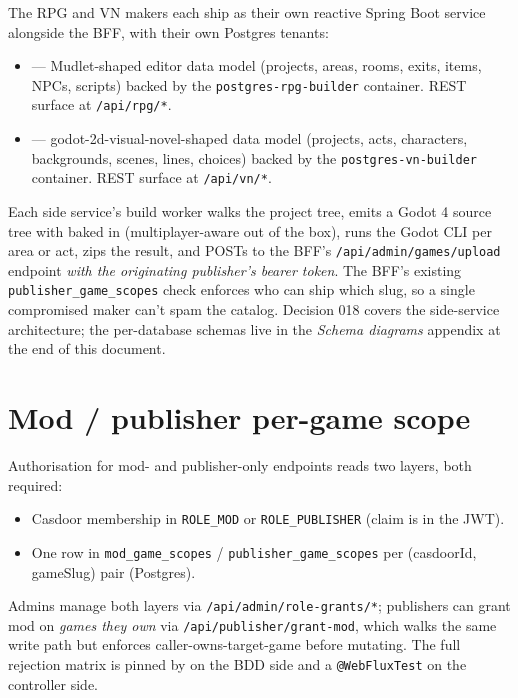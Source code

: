 The RPG and VN makers each ship as their own reactive Spring Boot
service alongside the BFF, with their own Postgres tenants:

\begin{itemize}
  \item {} --- Mudlet-shaped editor data model
        (projects, areas, rooms, exits, items, NPCs, scripts) backed
        by the \texttt{postgres-rpg-builder} container. REST surface
        at \texttt{/api/rpg/*}.
  \item {} --- godot-2d-visual-novel-shaped data
        model (projects, acts, characters, backgrounds, scenes, lines,
        choices) backed by the \texttt{postgres-vn-builder} container.
        REST surface at \texttt{/api/vn/*}.
\end{itemize}

Each side service's build worker walks the project tree, emits a Godot
4 source tree with  baked in
(multiplayer-aware out of the box), runs the Godot CLI per area or act,
zips the result, and POSTs to the BFF's
\texttt{/api/admin/games/upload} endpoint \emph{with the originating
publisher's bearer token}. The BFF's existing
\texttt{publisher\_game\_scopes} check enforces who can ship which
slug, so a single compromised maker can't spam the catalog. Decision
018 covers the side-service architecture; the per-database schemas
live in the \emph{Schema diagrams} appendix at the end of this
document.

\section{Mod / publisher per-game scope}

Authorisation for mod- and publisher-only endpoints reads two layers,
both required:

\begin{itemize}
  \item Casdoor membership in \texttt{ROLE\_MOD} or
        \texttt{ROLE\_PUBLISHER} (claim is in the JWT).
  \item One row in \texttt{mod\_game\_scopes} /
        \texttt{publisher\_game\_scopes} per (casdoorId, gameSlug)
        pair (Postgres).
\end{itemize}

Admins manage both layers via \texttt{/api/admin/role-grants/*};
publishers can grant mod on \emph{games they own} via
\texttt{/api/publisher/grant-mod}, which walks the same write path but
enforces caller-owns-target-game before mutating. The full rejection
matrix is pinned by
 on the BDD side
and a \texttt{@WebFluxTest} on the controller side.

